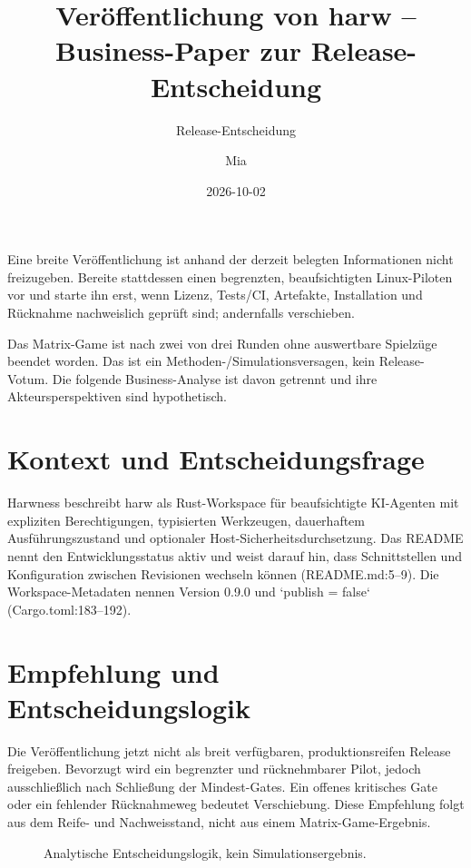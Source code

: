 \documentclass[11pt,a4paper]{scrartcl}
\title{Veröffentlichung von harw – Business-Paper zur Release-Entscheidung}
\subtitle{Release-Entscheidung}
\author{Mia}
\date{2026-10-02}
\begin{document}
\maketitle

\begin{merke}[Kernaussage]
Eine breite Veröffentlichung ist anhand der derzeit belegten Informationen nicht freizugeben. Bereite stattdessen einen begrenzten, beaufsichtigten Linux-Piloten vor und starte ihn erst, wenn Lizenz, Tests/CI, Artefakte, Installation und Rücknahme nachweislich geprüft sind; andernfalls verschieben.
\end{merke}
\begin{achtung}
Das Matrix-Game ist nach zwei von drei Runden ohne auswertbare Spielzüge beendet worden. Das ist ein Methoden-/Simulationsversagen, kein Release-Votum. Die folgende Business-Analyse ist davon getrennt und ihre Akteursperspektiven sind hypothetisch.
\end{achtung}
\tableofcontents
\newpage

\section{Kontext und Entscheidungsfrage}\label{sec:kontext}
Harwness beschreibt harw als Rust-Workspace für beaufsichtigte KI-Agenten mit expliziten Berechtigungen, typisierten Werkzeugen, dauerhaftem Ausführungszustand und optionaler Host-Sicherheitsdurchsetzung. Das README nennt den Entwicklungsstatus aktiv und weist darauf hin, dass Schnittstellen und Konfiguration zwischen Revisionen wechseln können (README.md:5–9). Die Workspace-Metadaten nennen Version 0.9.0 und `publish = false` (Cargo.toml:183–192).

\section{Empfehlung und Entscheidungslogik}\label{sec:empfehlung}
Die Veröffentlichung jetzt nicht als breit verfügbaren, produktionsreifen Release freigeben. Bevorzugt wird ein begrenzter und rücknehmbarer Pilot, jedoch ausschließlich nach Schließung der Mindest-Gates. Ein offenes kritisches Gate oder ein fehlender Rücknahmeweg bedeutet Verschiebung. Diese Empfehlung folgt aus dem Reife- und Nachweisstand, nicht aus einem Matrix-Game-Ergebnis.

\begin{figure}[htbp]
\centering
{}
\caption{Analytische Entscheidungslogik, kein Simulationsergebnis.}\label{fig:logik}
\end{figure}
\end{document}
